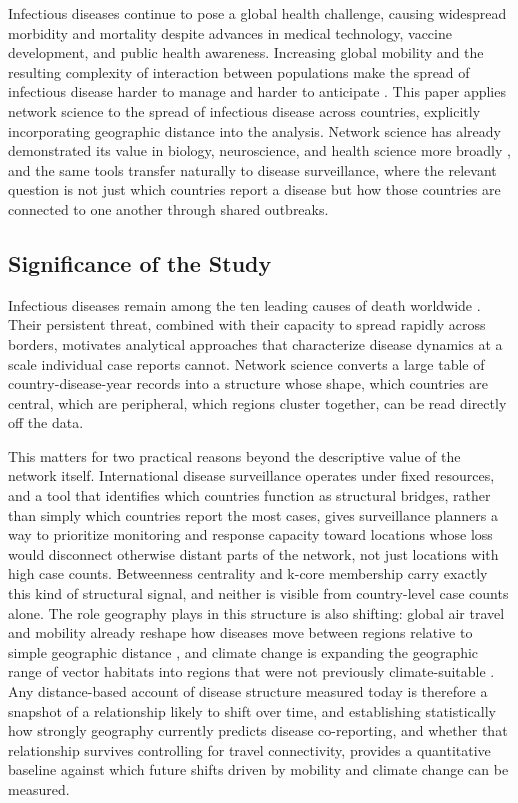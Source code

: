 \documentclass[11pt]{article}
\begin{document}
Infectious diseases continue to pose a global health challenge, causing widespread
morbidity and mortality despite advances in medical technology, vaccine development, and
public health awareness. Increasing global mobility and the resulting complexity of
interaction between populations make the spread of infectious disease harder to manage and
harder to anticipate \cite{baker2022}. This paper applies network science to the spread of
infectious disease across countries, explicitly incorporating geographic distance into the
analysis. Network science has already demonstrated its value in biology, neuroscience, and
health science more broadly \cite{barabasi2023,serban2020,leme2020}, and the same tools
transfer naturally to disease surveillance, where the relevant question is not just which
countries report a disease but how those countries are connected to one another through
shared outbreaks.

\subsection{Significance of the Study}

Infectious diseases remain among the ten leading causes of death worldwide
\cite{who2020}. Their persistent threat, combined with their capacity to spread rapidly
across borders, motivates analytical approaches that characterize disease dynamics at a
scale individual case reports cannot. Network science converts a large table of
country-disease-year records into a structure whose shape, which countries are central,
which are peripheral, which regions cluster together, can be read directly off the data.

This matters for two practical reasons beyond the descriptive value of the network itself.
International disease surveillance operates under fixed resources, and a tool that
identifies which countries function as structural bridges, rather than simply which
countries report the most cases, gives surveillance planners a way to prioritize monitoring
and response capacity toward locations whose loss would disconnect otherwise distant parts
of the network, not just locations with high case counts. Betweenness centrality and k-core
membership carry exactly this kind of structural signal, and neither is visible from
country-level case counts alone. The role geography plays in this structure is also
shifting: global air travel and mobility already reshape how diseases move between regions
relative to simple geographic distance \cite{balcan2009}, and climate change is expanding
the geographic range of vector habitats into regions that were not previously
climate-suitable \cite{paz2024}. Any distance-based account of disease structure measured
today is therefore a snapshot of a relationship likely to shift over time, and establishing
statistically how strongly geography currently predicts disease co-reporting, and whether
that relationship survives controlling for travel connectivity, provides a quantitative
baseline against which future shifts driven by mobility and climate change can be measured.
\end{document}
